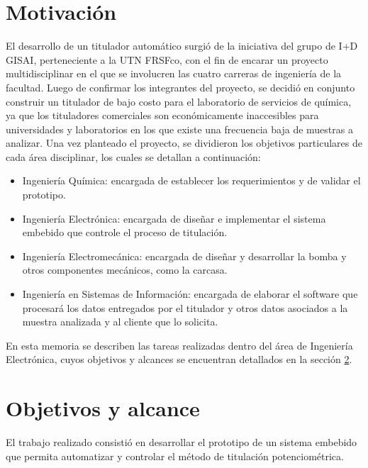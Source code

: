 \section{Motivación}
El desarrollo de un titulador automático surgió de la iniciativa del grupo de I+D GISAI, perteneciente a la UTN FRSFco, con el fin de encarar un proyecto multidisciplinar en el que se involucren las cuatro carreras de ingeniería de la facultad. Luego de confirmar los integrantes del proyecto, se decidió en conjunto construir un titulador de bajo costo para el laboratorio de servicios de química, ya que los tituladores comerciales son económicamente inaccesibles para universidades y laboratorios en los que existe una frecuencia baja de muestras a analizar.
Una vez planteado el proyecto, se dividieron los objetivos particulares de cada área disciplinar, los cuales se detallan a continuación:
\begin{itemize}
\item Ingeniería Química: encargada de establecer los requerimientos y de validar el prototipo.
\item Ingeniería Electrónica: encargada de diseñar e implementar el sistema embebido que controle el proceso de titulación.
\item Ingeniería Electromecánica: encargada de diseñar y desarrollar la bomba y otros componentes mecánicos, como la carcasa.
\item Ingeniería en Sistemas de Información: encargada de elaborar el software que procesará los datos entregados por el titulador y otros datos asociados a la muestra analizada y al cliente que lo solicita.
\end{itemize}
En esta memoria se describen las tareas realizadas dentro del área de Ingeniería Electrónica, cuyos objetivos y alcances se encuentran detallados en la sección \ref{objYalc}.

\section{Objetivos y alcance}
\label{objYalc}

El trabajo realizado consistió en desarrollar el prototipo de un sistema embebido que permita automatizar y controlar el método de titulación potenciométrica.

